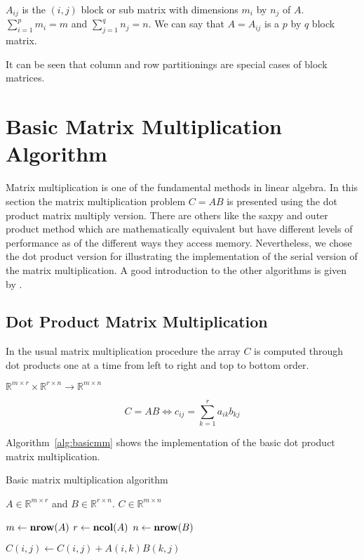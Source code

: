 $A_{ij}$ is the $(i,j)$ block or sub matrix with dimensions $m_i$ by
$n_j$ of $A$. $\sum_{i=1}^p m_i = m$ and $\sum_{j=1}^q n_j = n$. 
We can say that $A = A_{ij}$ is a $p$ by $q$ block
matrix.   

It can be seen that column and row partitionings are special cases of
block matrices.

\section{Basic Matrix Multiplication Algorithm}

Matrix multiplication is one of the fundamental methods in linear
algebra. In 
this section the matrix multiplication problem $C = AB$ is
presented using the dot product matrix multiply version. There are
others like the saxpy and outer product method which are
mathematically equivalent but have different levels of
performance as of the different ways they access memory. Nevertheless,
we chose the dot product version for illustrating the implementation
of the serial version of the matrix multiplication. A good
introduction to the other algorithms is given by \cite{golub96mc}. 

\subsection{Dot Product Matrix Multiplication}
In the usual matrix multiplication procedure the array $C$ is computed
through dot products one at a time from left to right and top to
bottom order.
\newline

$\mathbb{R}^{m \times r} \times
\mathbb{R}^{r \times n} \to \mathbb{R}^{m \times n}$

$$ C = AB \Longleftrightarrow c_{ij} = \sum_{k=1}^r a_{ik}b_{kj} $$

Algorithm~\ref{alg:basicmm} shows the implementation of the basic dot
product matrix multiplication.

\begin{algorithm}
\caption{Basic matrix multiplication algorithm}
\label{alg:basicmm}
\begin{algorithmic}[1]

  \REQUIRE $A \in \mathbb{R}^{m \times r}$ and $B \in \mathbb{R}^{r
    \times n}$.
  \ENSURE $C \in \mathbb{R}^{m \times n}$

  \STATE $m \leftarrow \textbf{nrow} (A)$
  \STATE $r \leftarrow \textbf{ncol} (A)$
  \STATE $n \leftarrow \textbf{nrow} (B)$

         \STATE $C(i,j) \leftarrow C(i,j) + A(i,k)B(k,j)$
       \ENDFOR
    \ENDFOR
  \ENDFOR

\end{algorithmic}
\end{algorithm}

